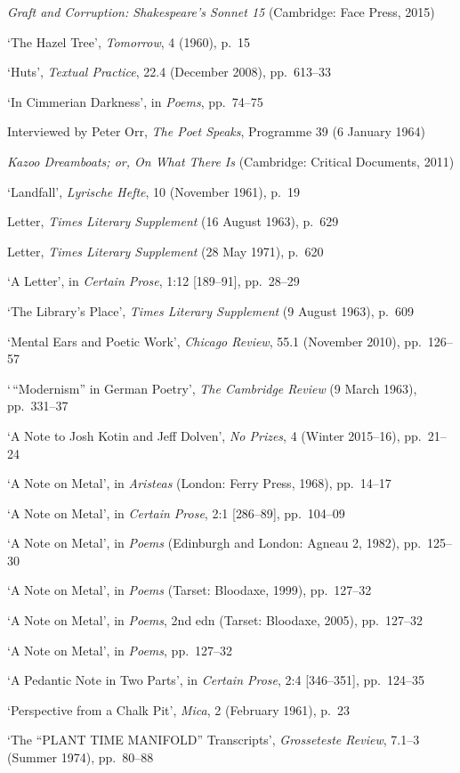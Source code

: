 \documentclass[]{article}
\begin{document}
\emph{Graft and Corruption: Shakespeare's Sonnet 15} (Cambridge: Face
Press, 2015)

`The Hazel Tree', \emph{Tomorrow}, 4 (1960), p.~15

`Huts', \emph{Textual Practice}, 22.4 (December 2008), pp.~613--33

`In Cimmerian Darkness', in \emph{Poems}, pp.~74--75

Interviewed by Peter Orr, \emph{The Poet Speaks}, Programme 39 (6
January 1964)

\emph{Kazoo Dreamboats; or, On What There Is} (Cambridge: Critical
Documents, 2011)

`Landfall', \emph{Lyrische Hefte}, 10 (November 1961), p.~19

Letter, \emph{Times Literary Supplement} (16 August 1963), p.~629

Letter, \emph{Times Literary Supplement} (28 May 1971), p.~620

`A Letter', in \emph{Certain Prose}, 1:12 {[}189--91{]}, pp.~28--29

`The Library's Place', \emph{Times Literary Supplement} (9 August 1963),
p.~609

`Mental Ears and Poetic Work', \emph{Chicago Review}, 55.1 (November
2010), pp.~126--57

`\,``Modernism'' in German Poetry', \emph{The Cambridge Review} (9 March
1963), pp.~331--37

`A Note to Josh Kotin and Jeff Dolven', \emph{No Prizes}, 4 (Winter
2015--16), pp.~21--24

`A Note on Metal', in \emph{Aristeas} (London: Ferry Press, 1968),
pp.~14--17

`A Note on Metal', in \emph{Certain Prose}, 2:1 {[}286--89{]},
pp.~104--09

`A Note on Metal', in \emph{Poems} (Edinburgh and London: Agneau 2,
1982), pp.~125--30

`A Note on Metal', in \emph{Poems} (Tarset: Bloodaxe, 1999), pp.~127--32

`A Note on Metal', in \emph{Poems}, 2nd edn (Tarset: Bloodaxe, 2005),
pp.~127--32

`A Note on Metal', in \emph{Poems}, pp.~127--32

`A Pedantic Note in Two Parts', in \emph{Certain Prose}, 2:4
{[}346--351{]}, pp.~124--35

`Perspective from a Chalk Pit', \emph{Mica}, 2 (February 1961), p.~23

`The ``PLANT TIME MANIFOLD'' Transcripts', \emph{Grosseteste Review},
7.1--3 (Summer 1974), pp.~80--88
\end{document}
